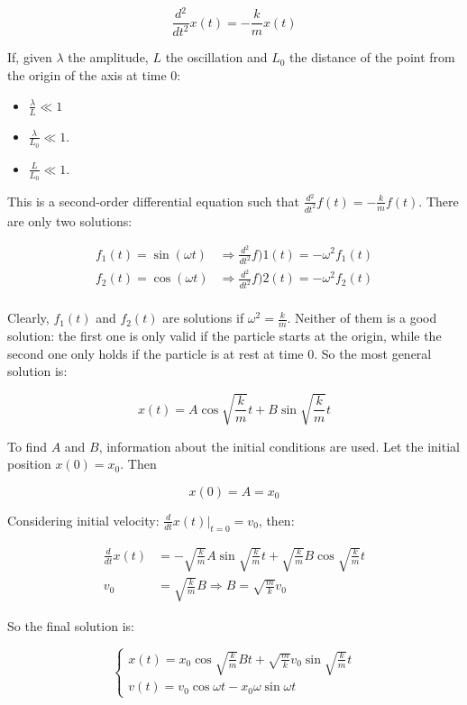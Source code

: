   $$\frac{d{^2}}{d{t^2}}x(t) = -\frac{k}{m}x(t)$$

  If, given $\lambda$ the amplitude, $L$ the oscillation and $L_0$ the distance of the point from the origin of the axis at time $0$:

  \begin{multicols}{3}
    \begin{itemize}
      \item $\frac{\lambda}{L}\ll 1$
      \item $\frac{\lambda}{L_0}\ll 1$.
      \item $\frac{L}{L_0}\ll 1$.
    \end{itemize}
  \end{multicols}

  This is a second-order differential equation such that $\frac{d{^2}}{d{t^2}}f(t) = -\frac{k}{m}f(t)$.
  There are only two solutions:

  \begin{align*}
    f_1(t) = \sin(\omega t) &\Rightarrow \frac{d{^2}}{d{t^2}}f)1(t) = -\omega^2f_1(t)\\
    f_2(t) = \cos(\omega t) &\Rightarrow \frac{d{^2}}{d{t^2}}f)2(t) = -\omega^2f_2(t)\\
  \end{align*}

  Clearly, $f_1(t)$ and $f_2(t)$ are solutions if $\omega^2 = \frac{k}{m}$.
  Neither of them is a good solution: the first one is only valid if the particle starts at the origin, while the second one only holds if the particle is at rest at time $0$.
  So the most general solution is:

  $$x(t) = A\cos\sqrt{\frac{k}{m}}t+B\sin\sqrt{\frac{k}{m}}t$$

  To find $A$ and $B$, information about the initial conditions are used.
  Let the initial position $x(0) = x_0$.
  Then 

  $$x(0) = A = x_0$$

  Considering initial velocity: $\frac{d{}}{d{t}}x(t)|_{t=0} = v_0$, then:

  \begin{align*}
    \frac{d{}}{d{t}}x(t) &= -\sqrt{\frac{k}{m}}A\sin\sqrt{\frac{k}{m}}t + \sqrt{\frac{k}{m}}B\cos\sqrt{\frac{k}{m}}t\\
    v_0 &= \sqrt{\frac{k}{m}} B \Rightarrow B = \sqrt{\frac{m}{k}}v_0
  \end{align*}

  So the final solution is:

  $$\begin{cases}
    x(t) = x_0\cos\sqrt{\frac{k}{m}}Bt+\sqrt{\frac{m}{k}}v_0\sin\sqrt{\frac{k}{m}}t\\
    v(t) = v_0\cos\omega t -x_0\omega\sin\omega t
  \end{cases}$$

